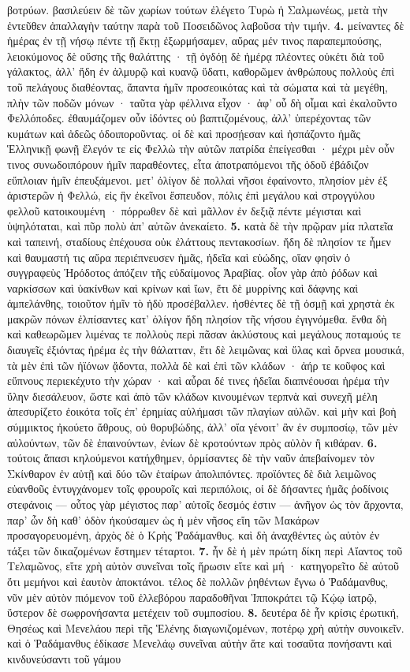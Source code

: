 \documentclass[a4paper, 11pt, oneside, polutonikogreek, german]{article}
\begin{document}
βοτρύων. βασιλεύειν δὲ τῶν χωρίων τούτων ἐλέγετο Τυρὼ ἡ Σαλμωνέως, μετὰ τὴν ἐντεῦθεν ἀπαλλαγὴν ταύτην παρὰ τοῦ Ποσειδῶνος λαβοῦσα τὴν τιμήν. \textbf{4.} μείναντες δὲ ἡμέρας ἐν τῇ νήσῳ πέντε τῇ ἕκτῃ ἐξωρμήσαμεν, αὔρας μέν τινος παραπεμπούσης, λειοκύμονος δὲ οὔσης τῆς θαλάττης · τῇ ὀγδόῃ δὲ ἡμέρᾳ πλέοντες οὐκέτι διὰ τοῦ γάλακτος, ἀλλ' ἤδη ἐν ἁλμυρῷ καὶ κυανῷ ὕδατι, καθορῶμεν ἀνθρώπους πολλοὺς ἐπὶ τοῦ πελάγους διαθέοντας, ἅπαντα ἡμῖν προσεοικότας καὶ τὰ σώματα καὶ τὰ μεγέθη, πλὴν τῶν ποδῶν μόνων · ταῦτα γὰρ φέλλινα εἶχον · ἀφ' οὗ δὴ οἶμαι καὶ ἐκαλοῦντο Φελλόποδες. ἐθαυμάζομεν οὖν ἰδόντες οὐ βαπτιζομένους, ἀλλ' ὑπερέχοντας τῶν κυμάτων καὶ ἀδεῶς ὁδοιποροῦντας. οἱ δὲ καὶ προσῄεσαν καὶ ἠσπάζοντο ἡμᾶς Ἑλληνικῇ φωνῇ ἔλεγόν τε εἰς Φελλὼ τὴν αὐτῶν πατρίδα ἐπείγεσθαι · μέχρι μὲν οὖν τινος συνωδοιπόρουν ἡμῖν παραθέοντες, εἶτα ἀποτραπόμενοι τῆς ὁδοῦ ἐβάδιζον εὔπλοιαν ἡμῖν ἐπευξάμενοι. μετ' ὀλίγον δὲ πολλαὶ νῆσοι ἐφαίνοντο, πλησίον μὲν ἐξ ἀριστερῶν ἡ Φελλώ, εἰς ἣν ἐκεῖνοι ἔσπευδον, πόλις ἐπὶ μεγάλου καὶ στρογγύλου φελλοῦ κατοικουμένη · πόρρωθεν δὲ καὶ μᾶλλον ἐν δεξιᾷ πέντε μέγισται καὶ ὑψηλόταται, καὶ πῦρ πολὺ ἀπ' αὐτῶν ἀνεκαίετο. \textbf{5.} κατὰ δὲ τὴν πρῷραν μία πλατεῖα καὶ ταπεινή, σταδίους ἐπέχουσα οὐκ ἐλάττους πεντακοσίων. ἤδη δὲ πλησίον τε ἦμεν καὶ θαυμαστή τις αὔρα περιέπνευσεν ἡμᾶς, ἡδεῖα καὶ εὐώδης, οἵαν φησὶν ὁ συγγραφεὺς Ἡρόδοτος ἀπόζειν τῆς εὐδαίμονος Ἀραβίας. οἷον γὰρ ἀπὸ ῥόδων καὶ ναρκίσσων καὶ ὑακίνθων καὶ κρίνων καὶ ἴων, ἔτι δὲ μυρρίνης καὶ δάφνης καὶ ἀμπελάνθης, τοιοῦτον ἡμῖν τὸ ἡδὺ προσέβαλλεν. ἡσθέντες δὲ τῇ ὀσμῇ καὶ χρηστὰ ἐκ μακρῶν πόνων ἐλπίσαντες κατ' ὀλίγον ἤδη πλησίον τῆς νήσου ἐγιγνόμεθα. ἔνθα δὴ καὶ καθεωρῶμεν λιμένας τε πολλοὺς περὶ πᾶσαν ἀκλύστους καὶ μεγάλους ποταμούς τε διαυγεῖς ἐξιόντας ἠρέμα ἐς τὴν θάλατταν, ἔτι δὲ λειμῶνας καὶ ὕλας καὶ ὄρνεα μουσικά, τὰ μὲν ἐπὶ τῶν ἠϊόνων ᾄδοντα, πολλὰ δὲ καὶ ἐπὶ τῶν κλάδων · ἀήρ τε κοῦφος καὶ εὔπνους περιεκέχυτο τὴν χώραν · καὶ αὖραι δέ τινες ἡδεῖαι διαπνέουσαι ἠρέμα τὴν ὕλην διεσάλευον, ὥστε καὶ ἀπὸ τῶν κλάδων κινουμένων τερπνὰ καὶ συνεχῆ μέλη ἀπεσυρίζετο ἐοικότα τοῖς ἐπ' ἐρημίας αὐλήμασι τῶν πλαγίων αὐλῶν. καὶ μὴν καὶ βοὴ σύμμικτος ἠκούετο ἄθρους, οὐ θορυβώδης, ἀλλ' οἵα γένοιτ' ἂν ἐν συμποσίῳ, τῶν μὲν αὐλούντων, τῶν δὲ ἐπαινούντων, ἐνίων δὲ κροτούντων πρὸς αὐλὸν ἢ κιθάραν. \textbf{6.} τούτοις ἅπασι κηλούμενοι κατήχθημεν, ὁρμίσαντες δὲ τὴν ναῦν ἀπεβαίνομεν τὸν Σκίνθαρον ἐν αὐτῇ καὶ δύο τῶν ἑταίρων ἀπολιπόντες. προϊόντες δὲ διὰ λειμῶνος εὐανθοῦς ἐντυγχάνομεν τοῖς φρουροῖς καὶ περιπόλοις, οἱ δὲ δήσαντες ἡμᾶς ῥοδίνοις στεφάνοις --- οὗτος γὰρ μέγιστος παρ' αὐτοῖς δεσμός ἐστιν --- ἀνῆγον ὡς τὸν ἄρχοντα, παρ' ὧν δὴ καθ' ὁδὸν ἠκούσαμεν ὡς ἡ μὲν νῆσος εἴη τῶν Μακάρων προσαγορευομένη, ἀρχὸς δὲ ὁ Κρὴς Ῥαδάμανθυς. καὶ δὴ ἀναχθέντες ὡς αὐτὸν ἐν τάξει τῶν δικαζομένων ἔστημεν τέταρτοι. \textbf{7.} ἦν δὲ ἡ μὲν πρώτη δίκη περὶ Αἴαντος τοῦ Τελαμῶνος, εἴτε χρὴ αὐτὸν συνεῖναι τοῖς ἥρωσιν εἴτε καὶ μή · κατηγορεῖτο δὲ αὐτοῦ ὅτι μεμήνοι καὶ ἑαυτὸν ἀποκτάνοι. τέλος δὲ πολλῶν ῥηθέντων ἔγνω ὁ Ῥαδάμανθυς, νῦν μὲν αὐτὸν πιόμενον τοῦ ἐλλεβόρου παραδοθῆναι Ἱπποκράτει τῷ Κῴῳ ἰατρῷ, ὕστερον δὲ σωφρονήσαντα μετέχειν τοῦ συμποσίου. \textbf{8.} δευτέρα δὲ ἦν κρίσις ἐρωτική, Θησέως καὶ Μενελάου περὶ τῆς Ἑλένης διαγωνιζομένων, ποτέρῳ χρὴ αὐτὴν συνοικεῖν. καὶ ὁ Ῥαδάμανθυς ἐδίκασε Μενελάῳ συνεῖναι αὐτὴν ἅτε καὶ τοσαῦτα πονήσαντι καὶ κινδυνεύσαντι τοῦ γάμου 
\end{document}
